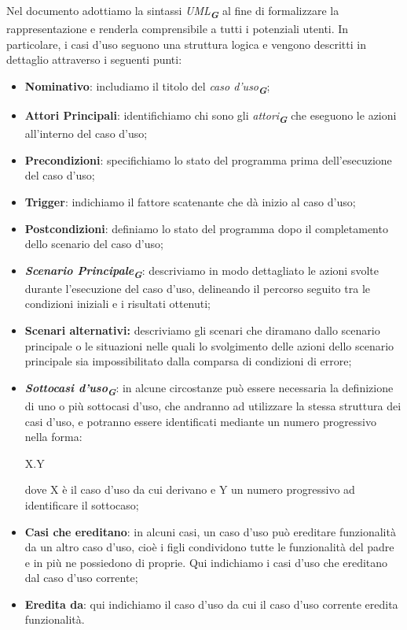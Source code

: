 Nel documento adottiamo la sintassi \emph{UML}\textsubscript{\textit{\textbf{G}}} al fine di formalizzare la rappresentazione e
renderla comprensibile a tutti i potenziali utenti. In particolare, i casi d'uso seguono una
struttura logica e vengono descritti in dettaglio attraverso i seguenti punti:
\begin{itemize}
    \item \textbf{Nominativo}: includiamo il titolo del \emph{caso d'uso}\textsubscript{\textit{\textbf{G}}};
    \item \textbf{Attori Principali}: identifichiamo chi sono gli \emph{attori}\textsubscript{\textit{\textbf{G}}} che eseguono le azioni all'interno 
                del caso d'uso;
    \item \textbf{Precondizioni}: specifichiamo lo stato del programma prima dell'esecuzione del caso d'uso;
    \item \textbf{Trigger}: indichiamo il fattore scatenante che dà inizio al caso d'uso;
    \item \textbf{Postcondizioni}: definiamo lo stato del programma dopo il completamento dello scenario del caso d'uso;
    \item \textbf{\emph{Scenario Principale}\textsubscript{\textit{\textbf{G}}}}: descriviamo in modo dettagliato le azioni svolte durante
                l'esecuzione del caso d'uso, delineando il percorso seguito tra le condizioni iniziali e i risultati ottenuti;
    \item \textbf{Scenari alternativi:} descriviamo gli scenari che diramano dallo scenario principale o le situazioni nelle quali lo svolgimento delle 
                azioni dello scenario principale sia impossibilitato dalla comparsa di condizioni di errore;
    \item \textbf{\emph{Sottocasi d'uso}\textsubscript{\textit{\textbf{G}}}}: in alcune circostanze può essere necessaria la definizione di uno
                o più sottocasi d'uso, che andranno ad utilizzare la stessa struttura dei casi d'uso, e potranno essere 
                identificati mediante un numero progressivo nella forma:
                \begin{center}
                    X.Y
                \end{center}
                dove X è il caso d'uso da cui derivano e Y un numero progressivo ad identificare il sottocaso;
    \item \textbf{Casi che ereditano}: in alcuni casi, un caso d'uso può ereditare funzionalità da un altro caso d'uso, cioè
                i figli condividono tutte le funzionalità del padre e in più ne possiedono di proprie. Qui 
                indichiamo i casi d'uso che ereditano dal caso d'uso corrente;
    \item \textbf{Eredita da}: qui indichiamo il caso d'uso da cui il caso d'uso corrente eredita funzionalità.
\end{itemize}

